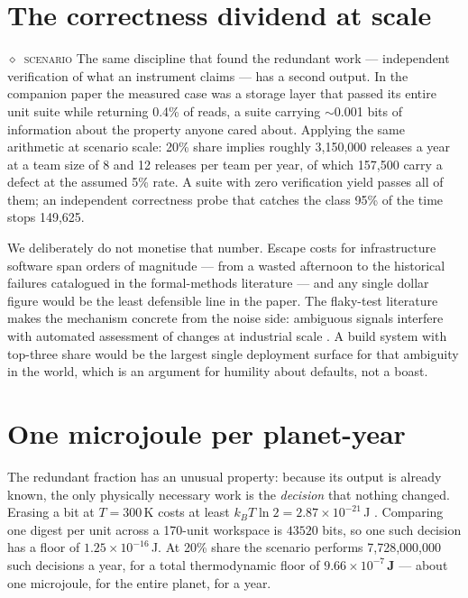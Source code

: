 \documentclass[11pt,a4paper]{article}
\providecommand{\textcite}[1]{\cite{#1}}
\newcommand{\derivedv}[1]{\textcolor{sigilviolet}{\textbf{#1}}}
\newcommand{\stC}{\textcolor{sigilred}{$\diamond$}~{\scriptsize\textsc{scenario}}}
\begin{document}
\section{The correctness dividend at scale}\label{sec:correct}


\stC{} The same discipline that found the redundant work --- independent verification of what an instrument claims --- has a second output. In the companion paper the measured case was a storage layer that passed its entire unit suite while returning 0.4\% of reads, a suite carrying $\sim$0.001 bits of information about the property anyone cared about. Applying the same arithmetic at scenario scale: 20\% share implies roughly 3{,}150{,}000 releases a year at a team size of 8 and 12 releases per team per year, of which 157{,}500 carry a defect at the assumed 5\% rate. A suite with zero verification yield passes all of them; an independent correctness probe that catches the class 95\% of the time stops 149{,}625.


We deliberately do not monetise that number. Escape costs for infrastructure software span orders of magnitude --- from a wasted afternoon to the historical failures catalogued in the formal-methods literature \textcite{arxiv2506_13821} --- and any single dollar figure would be the least defensible line in the paper. The flaky-test literature makes the mechanism concrete from the noise side: ambiguous signals interfere with automated assessment of changes at industrial scale \textcite{arxiv2602_03556}. A build system with top-three share would be the largest single deployment surface for that ambiguity in the world, which is an argument for humility about defaults, not a boast.


\section{One microjoule per planet-year}\label{sec:floor}


The redundant fraction has an unusual property: because its output is already known, the only physically necessary work is the \emph{decision} that nothing changed. Erasing a bit at $T=300$\,K costs at least $k_BT\ln2 = 2.87\times10^{-21}$\,J \textcite{arxiv1507_07450,arxiv2504_04284}. Comparing one digest per unit across a 170-unit workspace is $43520$ bits, so one such decision has a floor of $1.25\times10^{-16}$\,J. At 20\% share the scenario performs 7{,}728{,}000{,}000 such decisions a year, for a total thermodynamic floor of \derivedv{$9.66\times10^{-7}$\,J} --- about one microjoule, for the entire planet, for a year.
\end{document}
